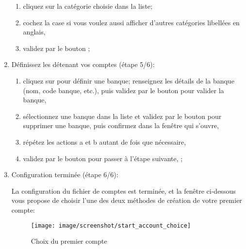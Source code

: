 \begin{enumerate}
		\begin{enumerate} 
		 	\item cliquez sur la catégorie choisie dans la liste;
			\item cochez la case  si vous voulez aussi afficher d'autres catégories libellées en anglais,
			\item validez par le bouton ;
		\end{enumerate}		

	\item Définissez les  détenant vos comptes (étape 5/6):
		\begin{enumerate} 
		 	\item cliquez sur  pour définir une banque; renseignez les détails de la banque (nom, code banque, etc.), puis validez par le bouton  pour valider la banque,
			\item sélectionnez une banque dans la liste et validez par le bouton  pour supprimer une banque, puis confirmez dans la fenêtre qui s'ouvre,
			\item répétez les actions a et b autant de fois que nécessaire,
			\item validez par le bouton  pour passer à l'étape suivante, ;
		\end{enumerate}		 	

	\item Configuration terminée (étape 6/6):\par
	La configuration du fichier de comptes est terminée, et la fenêtre ci-dessous vous propose de choisir l'une des deux méthodes de création de votre premier compte:

\vspace{2mm}

\begin{figure}[htbp]
\begin{center}
\texttt{[image: image/screenshot/start\_account\_choice]}
\end{center}
\caption{Choix du premier compte}
\label{start_account_choice}
\end{figure}


\end{enumerate}
